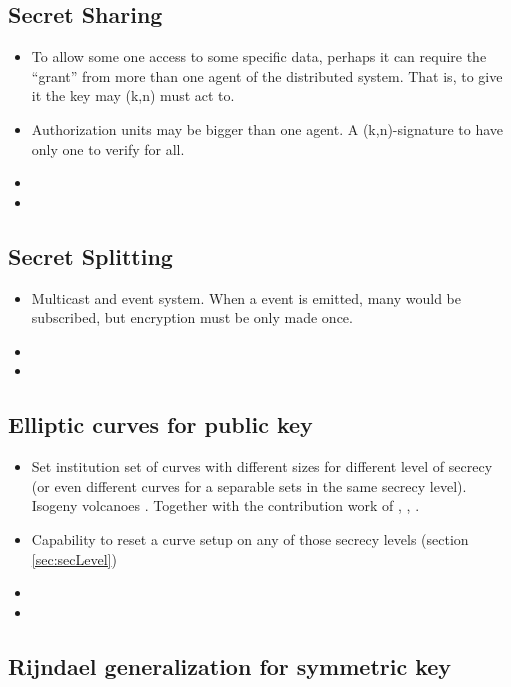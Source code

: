 \documentclass[10pt,a4paper,twoside]{llncs}
\begin{document}
%
\subsection{Secret Sharing \label{sec:secretSharing}}
\begin{itemize}
    \item To allow some one access to some specific data, perhaps it can require the ``grant'' from more than one agent of the distributed system. That is, to give it the key may (k,n) must act to.
    \item Authorization units may be bigger than one agent. A (k,n)-signature to have only one to verify for all.
    \item
    \item
\end{itemize}

\subsection{Secret Splitting \label{sec:secretSplitting}}
\begin{itemize}
    \item Multicast and event system. When a event is emitted, many would be subscribed, but encryption must be only made once.
    \item
    \item
\end{itemize}

%
\subsection{Elliptic curves for public key \label{sec:ecpk}}

\begin{itemize}
    \item Set institution set of curves with different sizes for different level of secrecy (or even different curves for a separable sets in the same secrecy level). Isogeny volcanoes \cite{secRickShareECs}. Together with the contribution work of \cite{JValera11}, \cite{Ramiro05}, \cite{Rosana11}.
    \item Capability to reset a curve setup on any of those secrecy levels (section \ref{sec:secLevel})
    \item 
    \item 
\end{itemize}

%
\subsection{Rijndael generalization for symmetric key \label{sec:gRijndael}}
\end{document}
